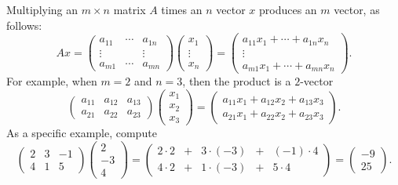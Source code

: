 \documentclass{ximera}
\begin{document}
Multiplying an $m\times n$ matrix $A$ times an $n$ vector $x$
produces an $m$ vector, as follows:
\begin{equation}  \label{Atimesx}
Ax=\left(
\begin{array}{ccc}
 a_{11}  & \cdots & a_{1n} \\
 \vdots  &        & \vdots  \\
 a_{m1}  & \cdots & a_{mn}
\end{array}
\right)
\left(
\begin{array}{c}
x_1 \\ \vdots \\ x_n
\end{array}
\right)
=
\left(
\begin{array}{c}
a_{11}x_1 + \cdots + a_{1n}x_n \\ \vdots \\
a_{m1}x_1 + \cdots + a_{mn}x_n
\end{array}
\right).
\end{equation}
For example, when $m=2$ and $n=3$, then the product is a $2$-vector
\begin{equation} \label{Atimesx231}
\left(
\begin{array}{ccc}
 a_{11}  & a_{12} & a_{13} \\
 a_{21}  & a_{22} & a_{23}
\end{array}
\right)
\left(
\begin{array}{c}
x_1 \\ x_2 \\ x_3
\end{array}
\right)
=
\left(
\begin{array}{c}
a_{11}x_1 + a_{12}x_2 + a_{13}x_3 \\
a_{21}x_1 + a_{22}x_2 + a_{23}x_3
\end{array}
\right).
\end{equation}
As a specific example, compute
\[
\left(
\begin{array}{rrr}
 2  & 3 & -1 \\
 4  & 1 &  5
\end{array}
\right)
\left(
\begin{array}{r}
2 \\ -3 \\ 4
\end{array}
\right)
=
\left(
\begin{array}{ccccc}
2\cdot 2 & + & 3\cdot(-3) & + & (-1)\cdot 4 \\
4\cdot 2 & + & 1\cdot(-3) & + & 5\cdot 4
\end{array}
\right)
=
\left(
\begin{array}{r}
-9 \\ 25
\end{array}
\right).
\]
\end{document}
